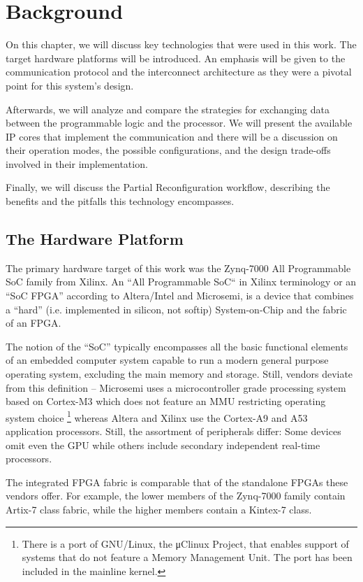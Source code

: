 \chapter{Background}

On this chapter, we will discuss key technologies that were used in this work.
The target hardware platforms will be introduced.
An emphasis will be given to the communication protocol and the interconnect architecture
as they were a pivotal point for this system's design.

Afterwards, we will analyze and compare the strategies for exchanging data between the
programmable logic and the processor. 
We will present the available IP cores that implement the communication and
there will be a discussion on their operation modes,
the possible configurations, and the design trade-offs involved in their implementation.

Finally, we will discuss the Partial Reconfiguration workflow,
describing the benefits and the pitfalls this technology encompasses.

\section{The Hardware Platform}

The primary hardware target of this work was the Zynq-7000 All Programmable SoC family from Xilinx.
An ``All Programmable SoC`` in Xilinx terminology or an ``SoC FPGA'' according to Altera/Intel and Microsemi,
is a device that combines a ``hard'' (i.e. implemented in silicon, not \gls{softip}) System-on-Chip
and the \gls{fabric} of an FPGA.

The notion of the ``SoC'' typically encompasses all the basic functional elements of
an embedded computer system capable to run a modern general purpose operating system,
excluding the main memory and storage. Still, vendors deviate from this definition --
Microsemi uses a microcontroller grade processing system based on Cortex-M3
which does not feature an MMU restricting operating system choice
\footnote{There is a port of GNU/Linux, the μClinux Project, that enables support of systems
that do not feature a Memory Management Unit. The port has been included in the mainline kernel.}
whereas Altera and Xilinx use the Cortex-A9 and A53 application processors.
Still, the assortment of peripherals differ:
Some devices omit even the GPU while others include secondary independent real-time processors.

The integrated FPGA \gls{fabric} is comparable that of the standalone FPGAs these vendors offer.
For example, the lower members of the Zynq-7000 family contain Artix-7 class \gls{fabric},
while the higher members contain a Kintex-7 class.

